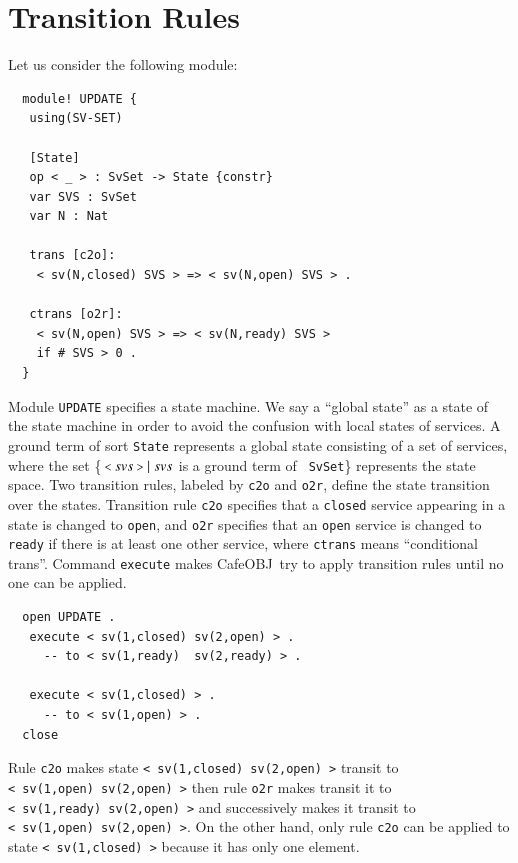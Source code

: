 \documentclass[12pt]{report}
\newcommand{\mbstt}[1]{\mbox{\small{\tt {#1}}}}
\newcommand{\stt}[1]{{\small{\tt {#1}}}}
\newcommand{\cafeobj}{{\sf CafeOBJ}~}
\begin{document}
\section{Transition Rules}
\label{sec:rules}
Let us consider the following module:
\small
\begin{verbatim}
  module! UPDATE {
   using(SV-SET)
  
   [State]
   op < _ > : SvSet -> State {constr}
   var SVS : SvSet    
   var N : Nat
  
   trans [c2o]: 
    < sv(N,closed) SVS > => < sv(N,open) SVS > .
  
   ctrans [o2r]: 
    < sv(N,open) SVS > => < sv(N,ready) SVS >
    if # SVS > 0 . 
  }
\end{verbatim}
\normalsize
Module {\tt UPDATE} specifies a state machine. We say a ``global state''
as a state of the state machine in order to avoid the confusion with
local states of services. A ground term of sort {\tt State} represents
a global state consisting of a set of services, where the set
\{$\ \mbstt{<}\ svs\ \mbstt{>}\mid svs$ is a ground term of {\tt
  SvSet}\} represents the state space. Two transition rules, labeled
by {\tt c2o} and {\tt o2r}, define the state transition over the
states.  Transition rule {\tt c2o} specifies that a {\tt closed}
service appearing in a state is changed to {\tt open}, and {\tt o2r}
specifies that an {\tt open} service is changed to {\tt ready} if
there is at least one other service, where {\tt ctrans} means ``conditional
trans''.  Command {\tt execute} makes \cafeobj try to apply transition
rules until no one can be applied.
\small
\begin{verbatim}
  open UPDATE .
   execute < sv(1,closed) sv(2,open) > .
     -- to < sv(1,ready)  sv(2,ready) > .

   execute < sv(1,closed) > .
     -- to < sv(1,open) > .
  close
\end{verbatim}
\normalsize
Rule {\tt c2o} makes state \stt{<~sv(1,closed)~sv(2,open)~>} transit
to \stt{<~sv(1,open)~sv(2,open)~>} then rule {\tt o2r} makes transit
it to \stt{<~sv(1,ready)~sv(2,open)~>} and successively makes it
transit to \stt{<~sv(1,open)~sv(2,open)~>}. On the other hand,
only rule {\tt c2o} can be applied to state \stt{<~sv(1,closed)~>}
because it has only one element.
\end{document}
